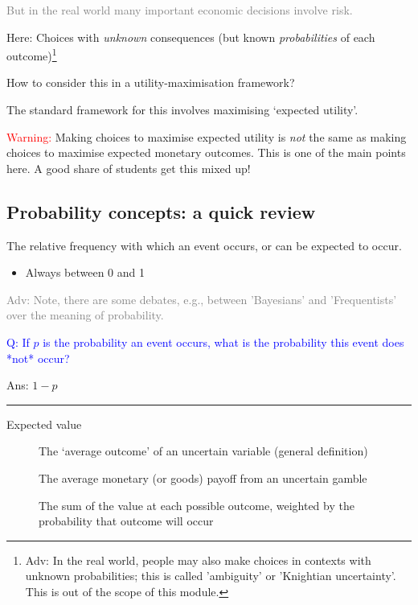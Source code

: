 \documentclass[]{article}
\providecommand{\tightlist}{%
  \setlength{\itemsep}{0pt}\setlength{\parskip}{0pt}}
\begin{document}
\textcolor{gray}{But in the real world many important economic decisions involve risk.}

\bigskip

Here: Choices with \emph{unknown} consequences (but known
\emph{probabilities} of each
outcome)\footnote{Adv: In the real world, people may also make choices in contexts with unknown probabilities; this is called 'ambiguity' or 'Knightian uncertainty'. This is out of the scope of this module.}

How to consider this in a utility-maximisation framework?

The standard framework for this involves maximising `expected utility'.

\textcolor{red}{Warning:} Making choices to maximise expected utility is
\emph{not} the same as making choices to maximise expected monetary
outcomes. This is one of the main points here. A good share of students
get this mixed up!

\hypertarget{probability-concepts-a-quick-review}{%
\subsection{Probability concepts: a quick
review}\label{probability-concepts-a-quick-review}}

\begin{description}
\tightlist
\item[Probability]
The relative frequency with which an event occurs, or can be expected to
occur.
\end{description}

\begin{itemize}
\tightlist
\item
  Always between 0 and 1
\end{itemize}

\textcolor{gray}{Adv: Note, there are some debates, e.g., between 'Bayesians' and 'Frequentists' over the meaning of probability.}

\textcolor{blue}{Q: If $p$ is the probability an event occurs, what is the probability this event does *not* occur?}

Ans: \(1-p\)

\begin{center}\rule{0.5\linewidth}{\linethickness}\end{center}

\begin{description}
\item[Expected value]
The `average outcome' of an uncertain variable (general definition)
\item[\bigskip]
The average monetary (or goods) payoff from an uncertain gamble
\item[\bigskip]
The sum of the value at each possible outcome, weighted by the
probability that outcome will occur
\end{description}
\end{document}
